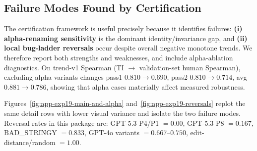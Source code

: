 \begin{table}[t]
  \centering
  \small
   \caption{\textbf{Leanstral remains low-alignment under multiple index constructions.} Re-aggregation improves over the arithmetic baseline in some splits, but all three settings remain near-zero or negative.
  This suggests the bottleneck is likely the underlying judge behavior for this ranking task (human-preference alignment), not only index form.
  One plausible hypothesis is that Leanstral is stronger for Lean proof editing/generation than for pairwise judging assessed against human ratings under this rubric; we treat this as a testable conjecture, not a final causal claim.}
  \label{tab:app-leanstral-index-reagg}
\end{table}

\subsection{Failure Modes Found by Certification}
The certification framework is useful precisely because it identifies failures: \textbf{(i) alpha-renaming sensitivity} is the dominant identity/invariance gap, and \textbf{(ii) local bug-ladder reversals} occur despite overall negative monotone trends.
We therefore report both strengths and weaknesses, and include alpha-ablation diagnostics.
On trend-v1 Spearman (TI \(\rightarrow\) validation-set human Spearman), excluding alpha variants changes pass1 \(0.810\rightarrow0.690\), pass2 \(0.810\rightarrow0.714\), avg \(0.881\rightarrow0.786\), showing that alpha cases materially affect measured robustness.

Figures~\ref{fig:app-exp19-main-and-alpha} and~\ref{fig:app-exp19-reversals} replot the same detail rows with lower visual variance and isolate the two failure modes.
Reversal rates in this package are: GPT-5.3 P4/P1 \(=0.00\), GPT-5.3 P8 \(=0.167\), BAD\_STRINGY \(=0.833\), GPT-4o variants \(=0.667\)--\(0.750\), edit-distance/random \(=1.00\).

